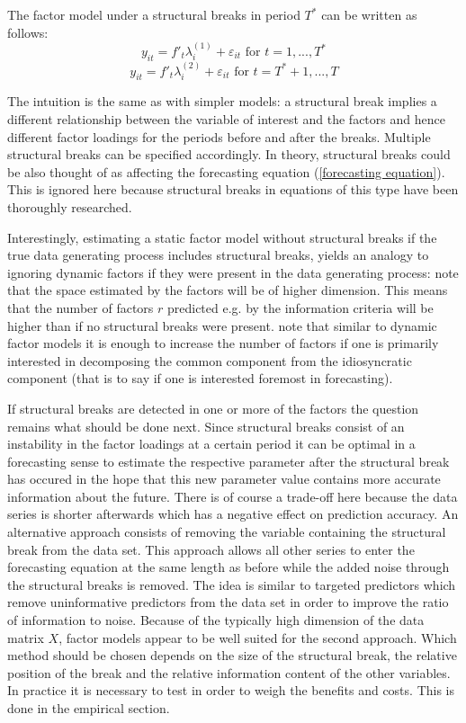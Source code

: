 \documentclass[12pt]{article}
\begin{document}
The factor model under a structural breaks in period $T^*$ can be written as follows:
\begin{equation}
	\label{}
	y_{it} = f'_t\lambda_i^{(1)} + \varepsilon_{it} \text{ for } t = 1, ..., T^*
\end{equation}
\begin{equation}
	\label{}
	y_{it} = f'_t\lambda_i^{(2)} + \varepsilon_{it} \text{ for } t = T^* + 1, ..., T
\end{equation}

The intuition is the same as with simpler models: a structural break implies a different relationship between the variable of interest and the factors and hence different factor loadings for the periods before and after the breaks. Multiple structural breaks can be specified accordingly. In theory, structural breaks could be also thought of as affecting the forecasting equation (\ref{forecasting equation}). This is ignored here because structural breaks in equations of this type have been thoroughly researched.


Interestingly, estimating a static factor model without structural breaks if the true data generating process includes structural breaks, yields an analogy to ignoring dynamic factors if they were present in the data generating process: \citet{breitung2011testing} note that the space estimated by the factors will be of higher dimension. This means that the number of factors $r$ predicted e.g. by the \citet{bai2002determining} information criteria will be higher than if no structural breaks were present. \citet{breitung2011testing} note that similar to dynamic factor models it is enough to increase the number of factors if one is primarily interested in decomposing the common component from the idiosyncratic component (that is to say if one is interested foremost in forecasting).

If structural breaks are detected in one or more of the factors the question remains what should be done next. Since structural breaks consist of an instability in the factor loadings at a certain period it can be optimal in a forecasting sense to estimate the respective parameter after the structural break has occured in the hope that this new parameter value contains more accurate information about the future. There is of course a trade-off here because the data series is shorter afterwards which has a negative effect on prediction accuracy.
An alternative approach consists of removing the variable containing the structural break from the data set. This approach allows all other series to enter the forecasting equation at the same length as before while the added noise through the structural breaks is removed. The idea is similar to targeted predictors which remove uninformative predictors from the data set in order to improve the ratio of information to noise. Because of the typically high dimension of the data matrix $X$, factor models appear to be well suited for the second approach. Which method should be chosen depends on the size of the structural break, the relative position of the break and the relative information content of the other variables. In practice it is necessary to test in order to weigh the benefits and costs. This is done in the empirical section.
\end{document}

